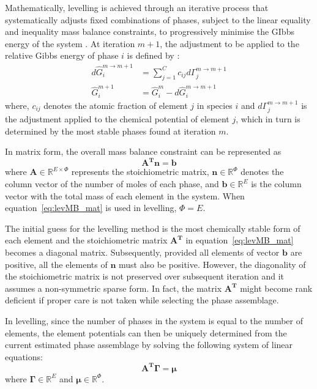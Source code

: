 	Mathematically, levelling is achieved through an iterative process that systematically adjusts fixed combinations of phases, subject to the linear equality and inequality mass balance constraints, to progressively minimise the GIbbs energy of the system \cite{Piro12a}. At iteration $m+1$, the adjustment to be applied to the relative Gibbs energy of phase $i$ is defined by \cite{Eriksson89}:
	\begin{equation} \label{eq:lev_adj}
		\begin{aligned}
			d \hat{G}_i^{m\rightarrow m+1} &= \sum_{j=1}^{C} c_{ij} d \Gamma_j^{m\rightarrow m+1}\\
			\hat{G}_i^{m+1} &= \hat{G}_i^{m} - d \hat{G}_i^{m\rightarrow m+1}
		\end{aligned}
	\end{equation}
	where, $c_{ij}$ denotes the atomic fraction of element $j$ in species $i$ and $d \Gamma_j^{m\rightarrow m+1}$ is the adjustment applied to the chemical potential of element $j$, which in turn is determined by the most stable phases found at iteration $m$.

	In  matrix form, the overall mass balance constraint can be represented as \cite{Piro12a}
	\begin{equation} \label{eq:levMB_mat}
		\mathbf{A^T} \mathbf{n}= \mathbf{b}
	\end{equation}
	where $\mathbf{A} \in \mathbb{R}^{E \times \Phi}$ represents the stoichiometric matrix, $\mathbf{n} \in \mathbb{R}^{\Phi }$ denotes the column vector of the number of moles of each phase, and $\mathbf{b} \in \mathbb{R}^{E}$ is the column vector with the total mass of each element in the system. When equation~\ref{eq:levMB_mat} is used in levelling, $\Phi = E$.

	The initial guess for the levelling method is the most chemically stable form of each element and the stoichiometric matrix $\mathbf{A^T}$ in equation~\eqref{eq:levMB_mat} becomes a diagonal matrix. Subsequently, provided all elements of vector $\mathbf{b}$ are positive, all the elements of $\mathbf{n}$ must also be positive. However, the diagonality of the stoichiometric matrix is not preserved over subsequent iteration and it assumes a non-symmetric sparse form. In fact, the matrix $\mathbf{A^T}$ might become rank deficient if proper care is not taken while selecting the phase assemblage.

	In levelling, since the number of phases in the system is equal to the number of elements, the element potentials can then be uniquely determined from the current estimated phase assemblage by solving the following system of linear equations:
	\begin{equation} \label{eq:levEP_mat}
		\mathbf{A^T} \boldsymbol{\Gamma} = \boldsymbol{\mu}
	\end{equation}
	where $\boldsymbol{\Gamma} \in \mathbb{R}^{E} $ and $\boldsymbol{\mu} \in \mathbb{R}^{\Phi}$.

